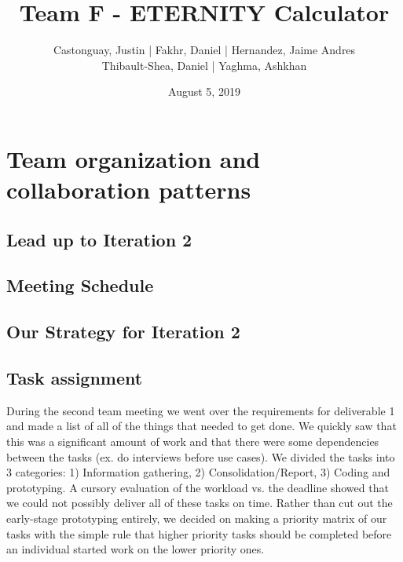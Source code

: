 \documentclass[a4paper]{article}
\begin{document}
\title{\LARGE{\textbf{Team F - ETERNITY Calculator}}}
\author{
	Castonguay, Justin | Fakhr, Daniel | Hernandez, Jaime Andres \\ Thibault-Shea, Daniel |
	Yaghma, Ashkhan \\
}
\date{August 5, 2019}

\fancyhf{}

\clearpage\maketitle
\thispagestyle{empty} %
\pagebreak

\setcounter{page}{2} %
\fancyhf{}
\renewcommand{\headrulewidth}{2pt}
\renewcommand{\footrulewidth}{1pt}
\fancyhead[LE,RO]{\rightmark}
\tableofcontents
\pagebreak




\section{Team organization and collaboration patterns}

\subsection{Lead up to Iteration 2}

\subsection{Meeting Schedule}


\subsection{Our Strategy for Iteration 2}


\subsection{Task assignment}

During the second team meeting we went over the requirements for deliverable 1 and made a list of all of the things that needed to get done. We quickly saw that this was a significant amount of work and that there were some dependencies between the tasks (ex. do interviews before use cases). We divided the tasks into 3 categories: 1) Information gathering, 2) Consolidation/Report, 3) Coding and prototyping. A cursory evaluation of the workload vs. the deadline showed that we could not possibly deliver all of these tasks on time. Rather than cut out the early-stage prototyping entirely, we decided on making a priority matrix of our tasks with the simple rule that higher priority tasks should be completed before an individual started work on the lower priority ones. \\
\end{document}
